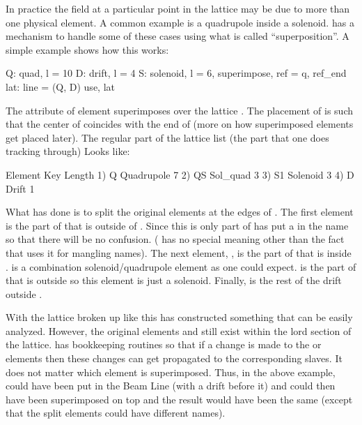 In practice the field at a particular point in the lattice may be due
to more than one physical element. A common example is a quadrupole
inside a solenoid. \bmad has a mechanism to handle some of these
cases using what is called ``superposition''. A simple example shows
how this works:
\begin{example}
  Q: quad, l = 10
  D: drift, l = 4
  S: solenoid, l = 6, superimpose, ref = q, ref_end
  lat: line = (Q, D)
  use, lat
\end{example}
The  attribute of element  superimposes 
over the lattice . The placement of  is such that the
center of  coincides with the end of  (more on how
superimposed elements get placed later). The regular part of the
lattice list (the part that one does tracking through) Looks like:
\begin{example}
        Element   Key         Length
  1)    Q{\B}        Quadrupole   7
  2)    Q{\B}S       Sol_quad     3
  3)    S{\B}1       Solenoid     3
  4)    D{\B}        Drift        1
\end{example}
What \bmad has done is to split the original elements  at
the edges of .  The first element  is the part of 
that is outside of . Since this is only part of  \bmad
has put a \vn{\B} in the name so that there will be no confusion.
(\vn{\B} has no special meaning other than the fact that \bmad uses
it for mangling names). The next element, , is the part of
 that is inside .  is a combination
solenoid/quadrupole element as one could expect.  is the part
of  that is outside  so this element is just a
solenoid. Finally,  is the rest of the drift outside .

With the lattice broken up like this \bmad has constructed something
that can be easily analyzed. However, the original elements  and
 still exist within the lord section of the lattice. \bmad has bookkeeping
routines so that if a change is made to the  or  elements then these
changes can get propagated to the corresponding slaves.  It does
not matter which element is superimposed. Thus, in the above example,
 could have been put in the Beam Line (with a drift before it)
and  could then have been superimposed on top and the result
would have been the same (except that the split elements could have
different names).

